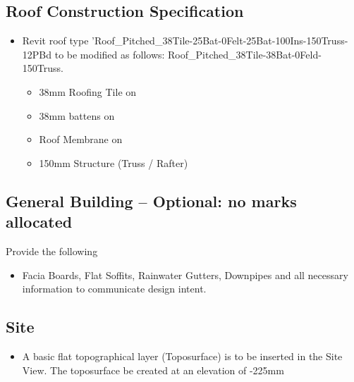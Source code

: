 \subsection*{Roof Construction Specification}
\begin{itemize}
	\item Revit roof type 'Roof\_Pitched\_38Tile-25Bat-0Felt-25Bat-100Ins-150Truss-12PBd to be modified as follows: Roof\_Pitched\_38Tile-38Bat-0Feld-150Truss.
	\begin{itemize}
		\item 38mm Roofing Tile on 
		\item 38mm battens on 
		\item Roof Membrane on 
		\item 150mm Structure (Truss / Rafter)
	\end{itemize}
\end{itemize}

\subsection*{General Building -- Optional: no marks allocated}
Provide the following
\begin{itemize}
	\item Facia Boards, Flat Soffits, Rainwater Gutters, Downpipes and all necessary information to communicate design intent.
\end{itemize}

\subsection*{Site}
\begin{itemize}
	\item A basic flat topographical layer (Toposurface) is to be inserted in the Site View.  The toposurface be created at an elevation of -225mm
\end{itemize}


